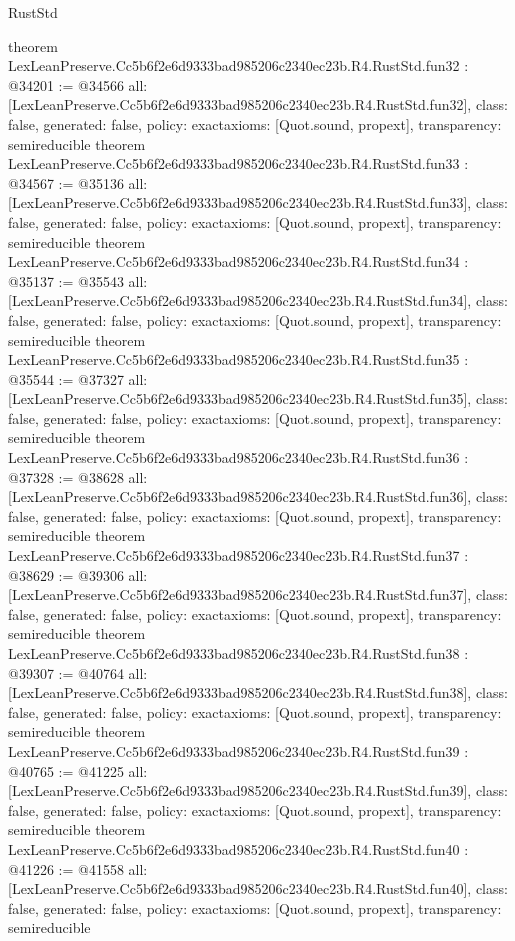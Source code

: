 \begin{lexlean}{RustStd}
\begin{coremodule}
{}
theorem LexLeanPreserve.Cc5b6f2e6d9333bad985206c2340ec23b.R4.RustStd.fun32 : @34201 := @34566 {
  all: [LexLeanPreserve.Cc5b6f2e6d9333bad985206c2340ec23b.R4.RustStd.fun32],
  class: false,
  generated: false,
  policy: exact{axioms: [Quot.sound, propext]},
  transparency: semireducible
}
theorem LexLeanPreserve.Cc5b6f2e6d9333bad985206c2340ec23b.R4.RustStd.fun33 : @34567 := @35136 {
  all: [LexLeanPreserve.Cc5b6f2e6d9333bad985206c2340ec23b.R4.RustStd.fun33],
  class: false,
  generated: false,
  policy: exact{axioms: [Quot.sound, propext]},
  transparency: semireducible
}
theorem LexLeanPreserve.Cc5b6f2e6d9333bad985206c2340ec23b.R4.RustStd.fun34 : @35137 := @35543 {
  all: [LexLeanPreserve.Cc5b6f2e6d9333bad985206c2340ec23b.R4.RustStd.fun34],
  class: false,
  generated: false,
  policy: exact{axioms: [Quot.sound, propext]},
  transparency: semireducible
}
theorem LexLeanPreserve.Cc5b6f2e6d9333bad985206c2340ec23b.R4.RustStd.fun35 : @35544 := @37327 {
  all: [LexLeanPreserve.Cc5b6f2e6d9333bad985206c2340ec23b.R4.RustStd.fun35],
  class: false,
  generated: false,
  policy: exact{axioms: [Quot.sound, propext]},
  transparency: semireducible
}
theorem LexLeanPreserve.Cc5b6f2e6d9333bad985206c2340ec23b.R4.RustStd.fun36 : @37328 := @38628 {
  all: [LexLeanPreserve.Cc5b6f2e6d9333bad985206c2340ec23b.R4.RustStd.fun36],
  class: false,
  generated: false,
  policy: exact{axioms: [Quot.sound, propext]},
  transparency: semireducible
}
theorem LexLeanPreserve.Cc5b6f2e6d9333bad985206c2340ec23b.R4.RustStd.fun37 : @38629 := @39306 {
  all: [LexLeanPreserve.Cc5b6f2e6d9333bad985206c2340ec23b.R4.RustStd.fun37],
  class: false,
  generated: false,
  policy: exact{axioms: [Quot.sound, propext]},
  transparency: semireducible
}
theorem LexLeanPreserve.Cc5b6f2e6d9333bad985206c2340ec23b.R4.RustStd.fun38 : @39307 := @40764 {
  all: [LexLeanPreserve.Cc5b6f2e6d9333bad985206c2340ec23b.R4.RustStd.fun38],
  class: false,
  generated: false,
  policy: exact{axioms: [Quot.sound, propext]},
  transparency: semireducible
}
theorem LexLeanPreserve.Cc5b6f2e6d9333bad985206c2340ec23b.R4.RustStd.fun39 : @40765 := @41225 {
  all: [LexLeanPreserve.Cc5b6f2e6d9333bad985206c2340ec23b.R4.RustStd.fun39],
  class: false,
  generated: false,
  policy: exact{axioms: [Quot.sound, propext]},
  transparency: semireducible
}
theorem LexLeanPreserve.Cc5b6f2e6d9333bad985206c2340ec23b.R4.RustStd.fun40 : @41226 := @41558 {
  all: [LexLeanPreserve.Cc5b6f2e6d9333bad985206c2340ec23b.R4.RustStd.fun40],
  class: false,
  generated: false,
  policy: exact{axioms: [Quot.sound, propext]},
  transparency: semireducible
}
\end{coremodule}
\end{lexlean}
